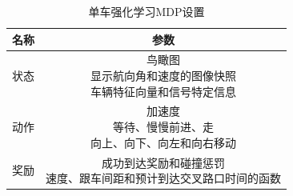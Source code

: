 \begin{table}[htb]
  \small
  \centering
  \caption{单车强化学习MDP设置}
  \label{tab:revi-1}
  \begin{tabular}{cc}
	\toprule[1.5pt]
	名称 & 参数  \\ 
	\midrule[0.75pt]
	状态 & \makecell{鸟瞰图 \\ 显示航向角和速度的图像快照 \\ 车辆特征向量和信号特定信息} \\
	动作 &  \makecell{加速度 \\ 等待、慢慢前进、走 \\ 向上、向下、向左和向右移动} \\
	奖励 & \makecell{成功到达奖励和碰撞惩罚 \\ 速度、跟车间距和预计到达交叉路口时间的函数} \\
	\bottomrule[1.5pt]
  \end{tabular}
\end{table}
